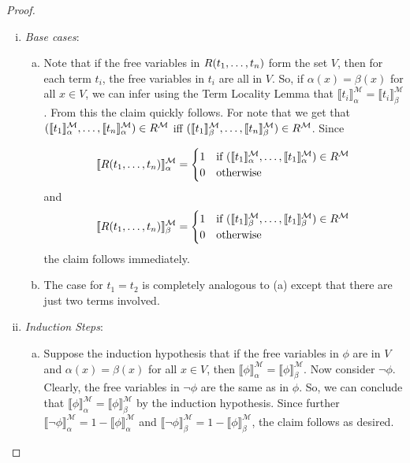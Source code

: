 \begin{enumerate}[\thesection.1]
\begin{proof}
		\begin{enumerate}[(i)]
		
			\item \emph{Base cases}: \begin{enumerate}[(a)]
			
				\item Note that if the free variables in  $R(t_1,\mathellipsis, t_n)$ form the set $V$, then for each term $t_i$, the free variables in $t_i$ are all in $V$. So, if $\alpha(x)=\beta(x)$ for all $x\in V$, we can infer using the Term Locality Lemma that $\llbracket t_i\rrbracket_\alpha^\mathcal{M}=\llbracket t_i\rrbracket_\beta^\mathcal{M}$.  From this the claim quickly follows. For note that we get that   $(\llbracket t_1\rrbracket_\alpha^\mathcal{M}, \mathellipsis, \llbracket t_n\rrbracket_\alpha^\mathcal{M})\in R^\mathcal{M}$ iff  $(\llbracket t_1\rrbracket_\beta^\mathcal{M}, \mathellipsis, \llbracket t_n\rrbracket_\beta^\mathcal{M})\in R^\mathcal{M}$. Since
				
				\[\llbracket R(t_1,\mathellipsis, t_n)\rrbracket_\alpha^\mathcal{M}=\begin{cases} 1 & \text{if }(\llbracket t_1\rrbracket^\mathcal{M}_\alpha,\mathellipsis, \llbracket t_1\rrbracket^\mathcal{M}_\alpha)\in R^\mathcal{M}\\0 &\text{otherwise}\end{cases}\]
				and 
				\[\llbracket R(t_1,\mathellipsis, t_n)\rrbracket_\beta^\mathcal{M}=\begin{cases} 1 & \text{if }(\llbracket t_1\rrbracket^\mathcal{M}_\beta,\mathellipsis, \llbracket t_1\rrbracket^\mathcal{M}_\beta)\in R^\mathcal{M}\\0 &\text{otherwise}\end{cases}\]
				the claim follows immediately.
				
								\item The case for $t_1=t_2$ is completely analogous to (a) except that there are just two terms involved.
				
			
			\end{enumerate}
			
			\item  \emph{Induction Steps}: \begin{enumerate}[(a)]
			
			\item Suppose the induction hypothesis that if the free variables in $\phi$ are in $V$ and $\alpha(x)=\beta(x)$ for all $x\in V$, then $\llbracket\phi\rrbracket_\alpha^\mathcal{M}=\llbracket\phi\rrbracket_\beta^\mathcal{M}$. Now consider $\neg\phi$. Clearly, the free variables in $\neg\phi$ are the same as in $\phi$. So, we can conclude that  $\llbracket\phi\rrbracket_\alpha^\mathcal{M}=\llbracket\phi\rrbracket_\beta^\mathcal{M}$ by the induction hypothesis. Since further $\llbracket\neg\phi\rrbracket_\alpha^\mathcal{M}=1-\llbracket\phi\rrbracket_\alpha^\mathcal{M}$ and $\llbracket\neg\phi\rrbracket_\beta^\mathcal{M}=1-\llbracket\phi\rrbracket_\beta^\mathcal{M}$, the claim follows as desired.
			

\end{enumerate}
\end{enumerate}
\end{proof}
\end{enumerate}
